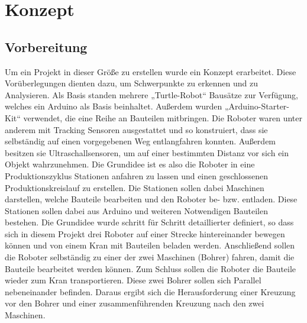 \chapter{Konzept}


\section{Vorbereitung}
Um ein Projekt in dieser Größe zu erstellen wurde ein Konzept erarbeitet. Diese Vorüberlegungen dienten dazu, um Schwerpunkte zu erkennen und zu Analysieren. Als Basis standen mehrere „Turtle-Robot“ Bausätze zur Verfügung, welches ein Arduino als Basis beinhaltet. Außerdem wurden „Arduino-Starter-Kit“ verwendet, die eine Reihe an Bauteilen mitbringen. Die Roboter waren unter anderem mit Tracking Sensoren ausgestattet und so konstruiert, dass sie selbständig auf einen vorgegebenen Weg entlangfahren konnten. Außerdem besitzen sie Ultraschallsensoren, um auf einer bestimmten Distanz vor sich ein Objekt wahrzunehmen.  
Die Grundidee ist es also die Roboter in eine Produktionszyklus Stationen anfahren zu lassen und einen geschlossenen Produktionskreislauf zu erstellen. Die Stationen sollen dabei Maschinen darstellen, welche Bauteile bearbeiten und den Roboter be- bzw. entladen. Diese Stationen sollen dabei aus Arduino und weiteren Notwendigen Bauteilen bestehen. Die Grundidee wurde schritt für Schritt detaillierter definiert, so dass sich in diesem Projekt drei Roboter auf einer Strecke hintereinander bewegen können und von einem Kran mit Bauteilen beladen werden. Anschließend sollen die Roboter selbständig zu einer der zwei Maschinen (Bohrer) fahren, damit die Bauteile bearbeitet werden können. Zum Schluss sollen die Roboter die Bauteile wieder zum Kran transportieren. Diese zwei Bohrer sollen sich Parallel nebeneinander befinden. Daraus ergibt sich die Herausforderung einer Kreuzung vor den Bohrer und einer zusammenführenden Kreuzung nach den zwei Maschinen.

